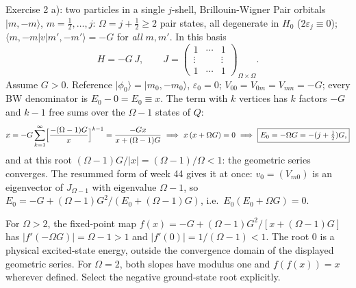\documentclass[aspectratio=169,10pt]{beamer}
\newcommand{\warnbox}[1]{%
  \begin{tcolorbox}[colback=palewarm,colframe=warm,title={\bfseries A trap to avoid}]
  #1
  \end{tcolorbox}}
\newcommand{\ket}[1]{\vert #1\rangle}
\newcommand{\mel}[3]{\langle #1\lvert #2\rvert #3\rangle}
\begin{document}
\begin{frame}[shrink=8]{Exercise 2 a): two particles in a single \(j\)-shell, Brillouin-Wigner}
Pair orbitals \(\ket{m,-m}\), \(m=\tfrac12,\dots,j\): \(\Omega=j+\tfrac12\ge2\) pair states, all degenerate in \(H_0\) (\(2\varepsilon_j\equiv0\)); \(\mel{m,-m}{v}{m',-m'}=-G\) for \emph{all} \(m,m'\). In this basis
\[
H=-G\,J,\qquad J=\begin{pmatrix}1&\cdots&1\\\vdots&&\vdots\\1&\cdots&1\end{pmatrix}_{\Omega\times\Omega}.
\]
Assume $G>0$. Reference \(\ket{\phi_0}=\ket{m_0,-m_0}\), \(\varepsilon_0=0\); \(V_{00}=V_{0m}=V_{mn}=-G\); every BW denominator is \(E_0-0=E_0\equiv x\). The term with \(k\) vertices has \(k\) factors \(-G\) and \(k-1\) free sums over the \(\Omega-1\) states of \(Q\):
\[
x=-G\sum_{k=1}^\infty\Bigl[\frac{-(\Omega-1)G}{x}\Bigr]^{k-1}=\frac{-Gx}{x+(\Omega-1)G}
\ \Longrightarrow\ x\,(x+\Omega G)=0
\ \Longrightarrow\ \boxed{E_0=-\Omega G=-(j+\tfrac12)G,}
\]
and at this root \((\Omega-1)G/|x|=(\Omega-1)/\Omega<1\): the geometric series converges. The resummed form of week 44 gives it at once: \(v_0=(V_{m0})\) is an eigenvector of \(J_{\Omega-1}\) with eigenvalue \(\Omega-1\), so \(E_0=-G+(\Omega-1)G^2/(E_0+(\Omega-1)G)\), i.e.\ \(E_0(E_0+\Omega G)=0\).
\warnbox{For $\Omega>2$, the fixed-point map $f(x)=-G+(\Omega-1)G^2/[x+(\Omega-1)G]$ has $|f'(-\Omega G)|=\Omega-1>1$ and $|f'(0)|=1/(\Omega-1)<1$. The root $0$ is a physical excited-state energy, outside the convergence domain of the displayed geometric series. For $\Omega=2$, both slopes have modulus one and $f(f(x))=x$ wherever defined. Select the negative ground-state root explicitly.}
\end{frame}
\end{document}
